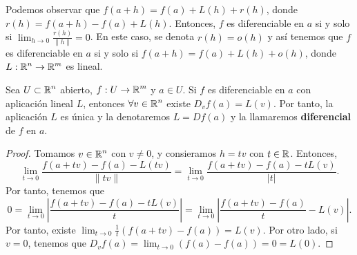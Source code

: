 \begin{observation}
Podemos observar que $\displaystyle f\left(a+h\right) = f\left(a\right) + L\left(h\right) + r\left(h\right) $, donde $\displaystyle r\left(h\right) = f\left(a+h\right)-f\left(a\right)+L\left(h\right) $. Entonces, $\displaystyle f $ es diferenciable en $\displaystyle a $ si y solo si $\displaystyle \lim_{h \to 0}\frac{r\left(h\right)}{ \|h\|} = 0 $. En este caso, se denota $\displaystyle r\left(h\right) = o\left(h\right) $ y así tenemos que $\displaystyle f $ es diferenciable en $\displaystyle a $ si y solo si $\displaystyle f\left(a+h\right) = f\left(a\right)+L\left(h\right)+o\left(h\right) $, donde $\displaystyle L : \mathbb{R}^{n} \to \mathbb{R}^{m} $ es lineal.
\end{observation}
\begin{prop}
Sea $\displaystyle U \subset \mathbb{R}^{n} $ abierto, $\displaystyle f : U \to \mathbb{R}^{m} $ y $\displaystyle a \in U $. Si $\displaystyle f $ es diferenciable en $\displaystyle a $ con aplicación lineal $\displaystyle L $, entonces $\displaystyle \forall v \in \mathbb{R}^{n} $ existe $\displaystyle D_{v}f\left(a\right) = L\left(v\right) $. Por tanto, la aplicación $\displaystyle L $ es única y la denotaremos $\displaystyle L = Df\left(a\right) $ y la llamaremos \textbf{diferencial} de $\displaystyle f $ en $\displaystyle a $.
\end{prop}
\begin{proof}
Tomamos $\displaystyle v \in \mathbb{R}^{n} $ con $\displaystyle v \neq 0 $, y consieramos $\displaystyle h = tv $ con $\displaystyle t \in \mathbb{R} $. Entonces, 
\[\lim_{t \to 0}\frac{f\left(a+tv\right)-f\left(a\right)-L\left(tv\right)}{ \|tv\|} = \lim_{t \to 0}\frac{f\left(a+tv\right)-f\left(a\right)-tL\left(v\right)}{ \left|t\right|} .\]
Por tanto, tenemos que 
\[0 = \lim_{t \to 0} \left|\frac{f\left(a+tv\right)-f\left(a\right)-tL\left(v\right)}{t}\right| = \lim_{t \to 0} \left|\frac{f\left(a+tv\right)-f\left(a\right)}{t}-L\left(v\right)\right| .\]
Por tanto, existe $\displaystyle \lim_{t \to 0}\frac{1}{t}\left(f\left(a+tv\right)-f\left(a\right)\right) = L\left(v\right) $. Por otro lado, si $\displaystyle v = 0 $, tenemos que $\displaystyle D_{v}f\left(a\right) = \lim_{t \to 0}\left(f\left(a\right)-f\left(a\right)\right) = 0 = L\left(0\right) $.
\end{proof}
